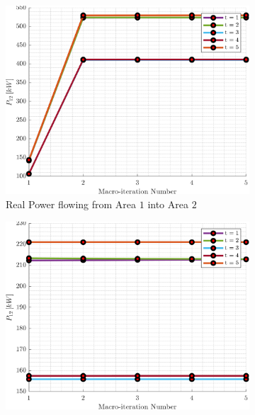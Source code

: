 \documentclass[../../outputs/main.tex]{subfiles}
\begin{document}
\begin{figure}[h!] %
    \centering
    \begin{subfigure}[b]{0.3\textwidth}
        \centering
        \includegraphics[width=\textwidth]{../figures/T5-pv20-batt30-genCost/dopf/convergenceCurves/BoundaryRealPower_vs_t_vs_macroItr_T_5_Areas_1_2_genCost_pv_20_batt_30_crop.png}
        \caption{\scriptsize Real Power flowing from Area $1$ into Area $2$}
        \label{fig:real_power_1_2}
    \end{subfigure}
    \hfill
    \begin{subfigure}[b]{0.3\textwidth}
        \centering
        \includegraphics[width=\textwidth]{../figures/T5-pv20-batt30-genCost/dopf/convergenceCurves/BoundaryRealPower_vs_t_vs_macroItr_T_5_Areas_1_3_genCost_pv_20_batt_30_crop.png}

\end{subfigure}
\end{figure}
\end{document}
